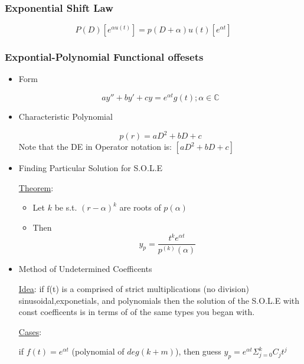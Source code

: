 \documentclass[11pt]{article}
\begin{document}
\subsubsection{Exponential Shift Law}
\label{sec-11.5.3}

    \begin{equation}
    P(D)[e^{\alpha u(t)}]=p(D+\alpha)u(t)[e^{\alpha t}]
    \end{equation}
\subsubsection{Expontial-Polynomial Functional offesets}
\label{sec-11.5.4}

\begin{itemize}

\item Form\\
\label{sec-11.5.4.1}

     \begin{equation}
     ay''+by'+cy=e^{\alpha t}g(t); \alpha\in\mathbb{C}
     \end{equation}

\item Characteristic Polynomial\\
\label{sec-11.5.4.2}

     \begin{equation}
     p(r)=aD^2+bD+c
     \end{equation}
     Note that the DE in Operator notation is: $[aD^2+bD+c]$

\item Finding Particular Solution for S.O.L.E\\
\label{sec-11.5.4.3}

     \underline{Theorem}:
\begin{itemize}
\item Let $k$ be s.t. $(r-\alpha)^k$ are roots of $p(\alpha)$
\item Then 
       \begin{equation}
       y_p=\frac{t^ke^{\alpha t}}{p^{(k)}(\alpha)}
       \end{equation}
\end{itemize}

\item Method of Undetermined Coefficents\\
\label{sec-11.5.4.4}

     \underline{Idea}: if f(t) is a comprised of strict multiplications (no division) sinusoidal,exponetials, and
     polynomials then the solution of the S.O.L.E with const
     coefficents is in terms of of the same types you began with.

     \underline{Cases}:
     
     if $f(t)=e^{\alpha t}$ (polynomial of $deg(k+m)$), then guess
     $y_p=e^{\alpha t}\Sigma_{j=0}^k C_jt^j$

\end{itemize} %
\end{document}
